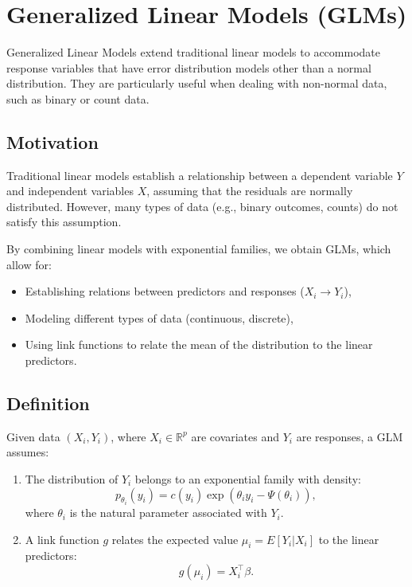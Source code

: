 \documentclass[open=any, 11pt,paper=A4]{scrreprt}
\begin{document}
\section{Generalized Linear Models (GLMs)}

Generalized Linear Models extend traditional linear models to accommodate response variables that have error distribution models other than a normal distribution. They are particularly useful when dealing with non-normal data, such as binary or count data.

\subsection{Motivation}

Traditional linear models establish a relationship between a dependent variable $Y$ and independent variables $X$, assuming that the residuals are normally distributed. However, many types of data (e.g., binary outcomes, counts) do not satisfy this assumption.

By combining linear models with exponential families, we obtain GLMs, which allow for:

\begin{itemize}
    \item Establishing relations between predictors and responses ($X_i \rightarrow Y_i$),
    \item Modeling different types of data (continuous, discrete),
    \item Using link functions to relate the mean of the distribution to the linear predictors.
\end{itemize}

\subsection{Definition}

Given data $(X_i, Y_i)$, where $X_i \in \mathbb{R}^p$ are covariates and $Y_i$ are responses, a GLM assumes:

\begin{enumerate}
    \item The distribution of $Y_i$ belongs to an exponential family with density:
    \[
    p_{\theta_i}(y_i) = c(y_i) \exp\left( \theta_i y_i - \Psi(\theta_i) \right),
    \]
    where $\theta_i$ is the natural parameter associated with $Y_i$.

    \item A link function $g$ relates the expected value $\mu_i = E[Y_i | X_i]$ to the linear predictors:
    \[
    g(\mu_i) = X_i^\top \beta.
    \]
\end{enumerate}
\end{document}
